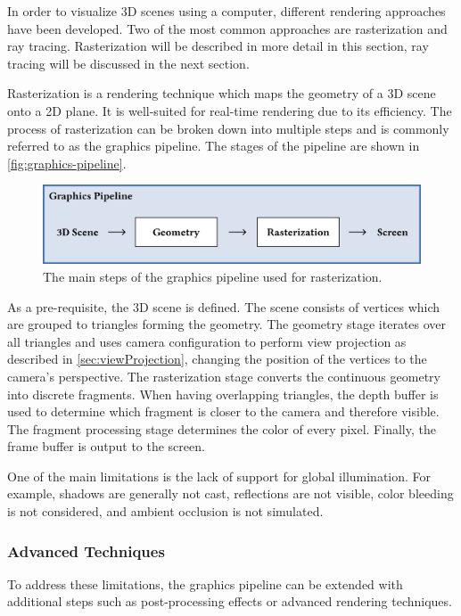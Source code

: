 In order to visualize 3D scenes using a computer, different rendering approaches have been developed. Two of the most common approaches are rasterization and ray tracing. Rasterization will be described in more detail in this section, ray tracing will be discussed in the next section.

Rasterization is a rendering technique which maps the geometry of a 3D scene onto a 2D plane. It is well-suited for real-time rendering due to its efficiency. The process of rasterization can be broken down into multiple steps and is commonly referred to as the graphics pipeline. The stages of the pipeline are shown in \autoref{fig:graphics-pipeline}.

\begin{figure}[H]
  \includegraphics[width=\columnwidth]{resources/graphics-pipeline.png}
  \caption{The main steps of the graphics pipeline used for rasterization.}
  \label{fig:graphics-pipeline}
\end{figure}

As a pre-requisite, the 3D scene is defined. The scene consists of vertices which are grouped to triangles forming the geometry. The geometry stage iterates over all triangles and uses camera configuration to perform view projection as described in \autoref{sec:viewProjection}, changing the position of the vertices to the camera's perspective. The rasterization stage converts the continuous geometry into discrete fragments. When having overlapping triangles, the depth buffer is used to determine which fragment is closer to the camera and therefore visible. The fragment processing stage determines the color of every pixel. Finally, the frame buffer is output to the screen.

One of the main limitations is the lack of support for global illumination. For example, shadows are generally not cast, reflections are not visible, color bleeding is not considered, and ambient occlusion is not simulated.

\subsubsection{Advanced Techniques}

To address these limitations, the graphics pipeline can be extended with additional steps such as post-processing effects or advanced rendering techniques.


